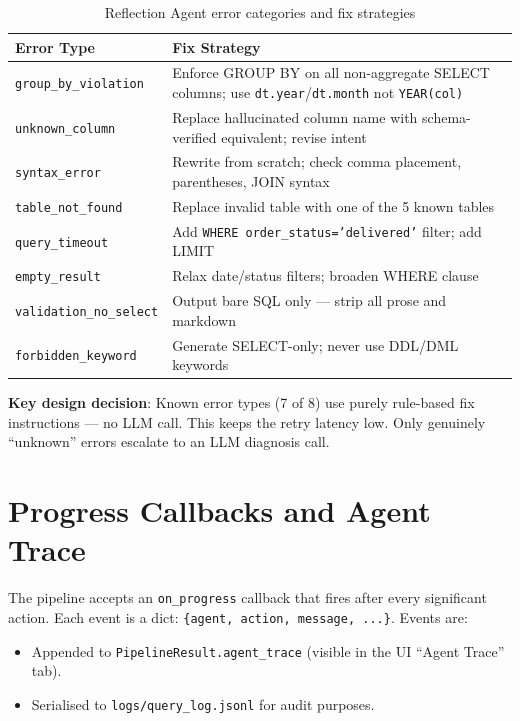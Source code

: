 \documentclass[12pt,a4paper]{report}
\begin{document}
\begin{table}[H]
  \centering
  \caption{Reflection Agent error categories and fix strategies}
  \label{tab:errors}
  \renewcommand{\arraystretch}{1.3}
  \begin{tabularx}{\textwidth}{lX}
    \toprule
    \textbf{Error Type} & \textbf{Fix Strategy} \\
    \midrule
    \texttt{group\_by\_violation} & Enforce GROUP BY on all non-aggregate SELECT columns; use \texttt{dt.year}/\texttt{dt.month} not \texttt{YEAR(col)} \\
    \texttt{unknown\_column}      & Replace hallucinated column name with schema-verified equivalent; revise intent \\
    \texttt{syntax\_error}        & Rewrite from scratch; check comma placement, parentheses, JOIN syntax \\
    \texttt{table\_not\_found}    & Replace invalid table with one of the 5 known tables \\
    \texttt{query\_timeout}       & Add \texttt{WHERE order\_status='delivered'} filter; add LIMIT \\
    \texttt{empty\_result}        & Relax date/status filters; broaden WHERE clause \\
    \texttt{validation\_no\_select} & Output bare SQL only — strip all prose and markdown \\
    \texttt{forbidden\_keyword}   & Generate SELECT-only; never use DDL/DML keywords \\
    \bottomrule
  \end{tabularx}
\end{table}

\textbf{Key design decision}: Known error types (7 of 8) use purely rule-based fix instructions
— no LLM call. This keeps the retry latency low. Only genuinely ``unknown'' errors escalate to
an LLM diagnosis call.

\section{Progress Callbacks and Agent Trace}

The pipeline accepts an \texttt{on\_progress} callback that fires after every significant action.
Each event is a dict: \texttt{\{agent, action, message, ...\}}. Events are:
\begin{itemize}
  \item Appended to \texttt{PipelineResult.agent\_trace} (visible in the UI ``Agent Trace'' tab).
  \item Serialised to \texttt{logs/query\_log.jsonl} for audit purposes.
\end{itemize}
\end{document}
